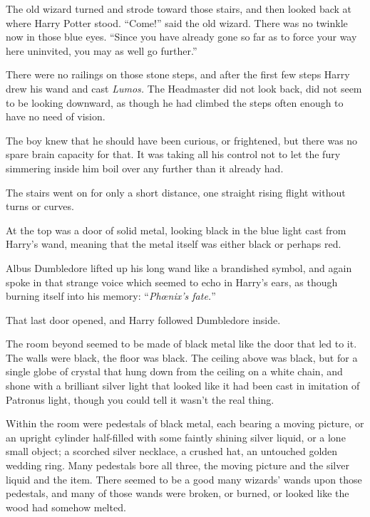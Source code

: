 The old wizard turned and strode toward those stairs, and then looked back at where Harry Potter stood. “Come!” said the old wizard. There was no twinkle now in those blue eyes. “Since you have already gone so far as to force your way here uninvited, you may as well go further.”

\later

There were no railings on those stone steps, and after the first few steps Harry drew his wand and cast \emph{Lumos.} The Headmaster did not look back, did not seem to be looking downward, as though he had climbed the steps often enough to have no need of vision.

The boy knew that he should have been curious, or frightened, but there was no spare brain capacity for that. It was taking all his control not to let the fury simmering inside him boil over any further than it already had.

The stairs went on for only a short distance, one straight rising flight without turns or curves.

At the top was a door of solid metal, looking black in the blue light cast from Harry’s wand, meaning that the metal itself was either black or perhaps red.

Albus Dumbledore lifted up his long wand like a brandished symbol, and again spoke in that strange voice which seemed to echo in Harry’s ears, as though burning itself into his memory: “\emph{Phœnix’s fate.}”

That last door opened, and Harry followed Dumbledore inside.

The room beyond seemed to be made of black metal like the door that led to it. The walls were black, the floor was black. The ceiling above was black, but for a single globe of crystal that hung down from the ceiling on a white chain, and shone with a brilliant silver light that looked like it had been cast in imitation of Patronus light, though you could tell it wasn’t the real thing.

Within the room were pedestals of black metal, each bearing a moving picture, or an upright cylinder half-filled with some faintly shining silver liquid, or a lone small object; a scorched silver necklace, a crushed hat, an untouched golden wedding ring. Many pedestals bore all three, the moving picture and the silver liquid and the item. There seemed to be a good many wizards’ wands upon those pedestals, and many of those wands were broken, or burned, or looked like the wood had somehow melted.

